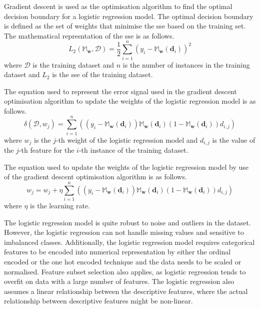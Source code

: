 \documentclass[10pt, conference]{IEEEtran}
\begin{document}
Gradient descent is used as the optimisation algorithm to find the optimal decision boundary for a logistic regression model.
The optimal decision boundary is defined as the set of weights that minimise the \acrfull{sse} based on the training set.
The mathematical represntation of the \acrshort{sse} is as follows.
\begin{equation}
    L_2\left(\mathbb{M}_{\textbf{w}}, \mathcal{D}\right) = \frac{1}{2} \sum_{i=1}^{n} \left( y_i - \mathbb{M}_{\textbf{w}}(\textbf{d}_i) \right)^2 \label{eq: sse_function}
\end{equation}
where $\mathcal{D}$ is the training dataset and $n$ is the number of instances in the training dataset and $L_2$ is the
\acrshort{sse} of the training dataset.

The equation used to represent the error signal used in the gradient descent optimisation algorithm to update the weights
of the logistic regression model is as follows.
\begin{equation}
    \delta(\mathcal{D}, w_j) = \sum_{i=1}^{n} \left((y_i - \mathbb{M}_{\textbf{w}}(\textbf{d}_i)) \mathbb{M}_{\textbf{w}}(\textbf{d}_i)
                                    (1-\mathbb{M}_{\textbf{w}}(\textbf{d}_i)) d_{i,j}\right) \label{eq: error_signal}
\end{equation}
where $w_j$ is the $j$-th weight of the logistic regression model and $d_{i,j}$ is the value of the $j$-th
feature for the $i$-th instance of the training dataset.

The equation used to update the weights of the logistic regression model by use of the gradient descent optimisation algorithm
is as follows.
\begin{equation}
    w_j = w_j + \eta \sum_{i=1}^{n} \left((y_i - \mathbb{M}_{\textbf{w}}(\textbf{d}_i)) \mathbb{M}_{\textbf{w}}(\textbf{d}_i)
                            (1-\mathbb{M}_{\textbf{w}}(\textbf{d}_i)) d_{i,j}\right) \label{eq: weight_update}
\end{equation}
where $\eta$ is the learning rate.

The logistic regression model is quite robust to noise and outliers in the dataset. However, the logistic
regression can not handle missing values and sensitive to imbalanced classes. Additionally, the logistic
regression model requires categorical features to be encoded into numerical representation by either the
ordinal encoded or the one hot encoded technique and the data needs to be scaled or normalised. Feature subset
selection also applies, as logistic regression tends to overfit on data with a large number of features.
The logistic regression also assumes a linear relationship between the descriptive
features, where the actual relationship between descriptive features might be non-linear.
\end{document}
